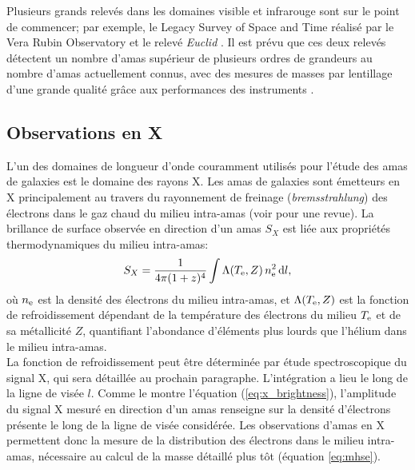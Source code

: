 Plusieurs grands relevés dans les domaines visible et infrarouge sont sur le point de commencer; par exemple, le Legacy Survey of Space and Time réalisé par le Vera Rubin Observatory \cite{lsst_science_collaboration_lsst_2009} et le relevé \textit{Euclid} \cite{amendola_cosmology_2013}.
Il est prévu que ces deux relevés détectent un nombre d'amas supérieur de plusieurs ordres de grandeurs au nombre d'amas actuellement connus, avec des mesures de masses par lentillage d'une grande qualité grâce aux performances des instruments \cite{lsst_dark_energy_science_collaboration_large_2012,sartoris_next_2016}.

\subsection{Observations en X}\label{sec:x}

L'un des domaines de longueur d'onde couramment utilisés pour l'étude des amas de galaxies est le domaine des rayons X.
Les amas de galaxies sont émetteurs en X principalement au travers du rayonnement de freinage (\textit{bremsstrahlung}) des électrons dans le gaz chaud du milieu intra-amas (voir \cite{bohringer_x-ray_2013} pour une revue).
La brillance de surface observée en direction d'un amas $S_X$ est liée aux propriétés thermodynamiques du milieu intra-amas:
\begin{equation}
    \label{eq:x_brightness}
    S_X = \frac{1}{4\pi (1+z)^4} \int \Lambda(T_{\rm e}, Z) \, n_{\rm e}^2 \, \mathrm{d} l,
\end{equation}
où $n_{\rm e}$ est la densité des électrons du milieu intra-amas, et $\Lambda(T_{\rm e}, Z)$ est la fonction de refroidissement dépendant de la température des électrons du milieu $T_{\rm e}$ et de sa métallicité $Z$, quantifiant l'abondance d'éléments plus lourds que l'hélium dans le milieu intra-amas. \\
La fonction de refroidissement peut être déterminée par étude spectroscopique du signal X, qui sera détaillée au prochain paragraphe.
L'intégration a lieu le long de la ligne de visée $l$.
Comme le montre l'équation (\ref{eq:x_brightness}), l'amplitude du signal X mesuré en direction d'un amas renseigne sur la densité d'électrons présente le long de la ligne de visée considérée.
Les observations d'amas en X permettent donc la mesure de la distribution des électrons dans le milieu intra-amas, nécessaire au calcul de la masse détaillé plus tôt (équation \ref{eq:mhse}).

